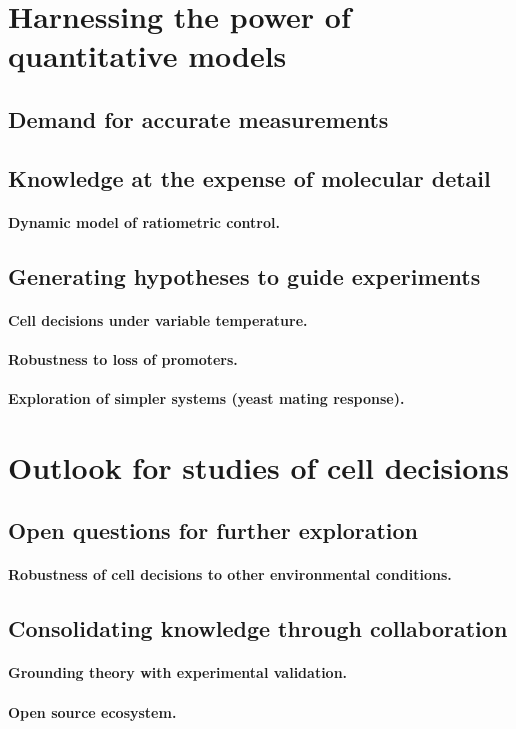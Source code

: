 \section{Harnessing the power of quantitative models}

	\subsection{Demand for accurate measurements}
	
	\subsection{Knowledge at the expense of molecular detail}
		\paragraph{Dynamic model of ratiometric control.}		
		
	\subsection{Generating hypotheses to guide experiments}
		\paragraph{Cell decisions under variable temperature.}		
		\paragraph{Robustness to loss of promoters.}
		\paragraph{Exploration of simpler systems (yeast mating response).}
		
\section{Outlook for studies of cell decisions}

	\subsection{Open questions for further exploration}
		\paragraph{Robustness of cell decisions to other environmental conditions.}	
					
	\subsection{Consolidating knowledge through collaboration}
	
		\paragraph{Grounding theory with experimental validation.}		
		\paragraph{Open source ecosystem.}
